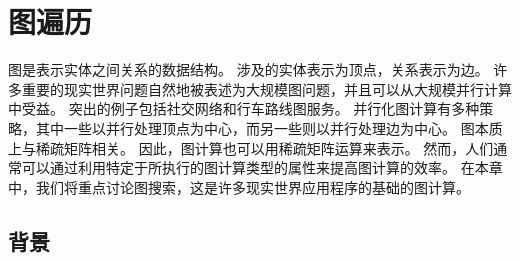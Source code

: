\section{图遍历}
图是表示实体之间关系的数据结构。 涉及的实体表示为顶点，关系表示为边。 许多重要的现实世界问题自然地被表述为大规模图问题，并且可以从大规模并行计算中受益。 突出的例子包括社交网络和行车路线图服务。 并行化图计算有多种策略，其中一些以并行处理顶点为中心，而另一些则以并行处理边为中心。 图本质上与稀疏矩阵相关。 因此，图计算也可以用稀疏矩阵运算来表示。 然而，人们通常可以通过利用特定于所执行的图计算类型的属性来提高图计算的效率。 在本章中，我们将重点讨论图搜索，这是许多现实世界应用程序的基础的图计算。

\subsection{背景}